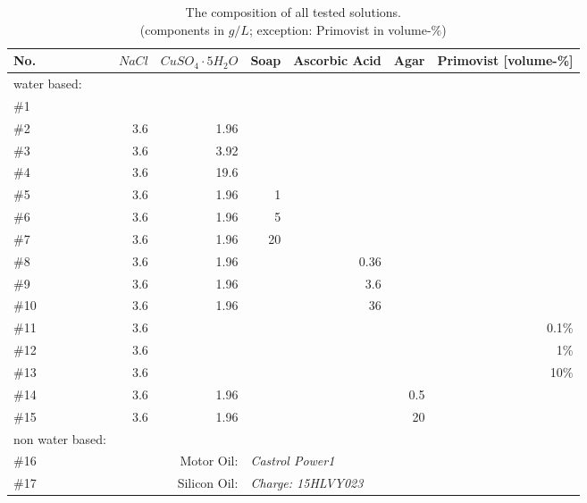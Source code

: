 \begin{table}[!hbt]
\centering
\begin{tabular}{@{}l|rrrrrr@{}}
No.   & $NaCl$   & $CuSO_4\cdot5H_2O$          & Soap & Ascorbic Acid & Agar & Primovist [volume-\%]\\
\toprule
water based: \\
\#1  &             &                   &      &               &           &		\\
\#2  & 3.6         & 1.96              &      &               &           &		\\
\#3  & 3.6         & 3.92              &      &               &           &		\\
\#4  & 3.6         & 19.6              &      &               &           &		\\
\#5  & 3.6         & 1.96              & 1    &               &           &		\\
\#6  & 3.6         & 1.96              & 5    &               &           &		\\
\#7  & 3.6         & 1.96              & 20   &               &           &		\\
\#8  & 3.6         & 1.96              &      & 0.36          &           &		\\
\#9  & 3.6         & 1.96              &      & 3.6           &           &		\\
\#10 & 3.6         & 1.96              &      & 36            &           &		\\
\#11 & 3.6         &                   &      &               &           & 0.1\%	\\
\#12 & 3.6         &                   &      &               &           & 1\%		\\
\#13 & 3.6         &                   &      &               &           & 10\%	\\
\#14 & 3.6         & 1.96              &      &               &  0.5      &		\\
\#15 & 3.6         & 1.96              &      &               &   20      &		\\
\midrule
non water based: \\
\#16 & \multicolumn{2}{r}{Motor Oil:}   & \multicolumn{4}{l}{\textit{Castrol Power1}}      \\
\#17 & \multicolumn{2}{r}{Silicon Oil:} & \multicolumn{4}{l}{\textit{Charge: 15HLVY023}}   \\ \bottomrule
\end{tabular}
\caption{The composition of all tested solutions.\\(components in $g/L$; exception: Primovist in volume-\%)}
\label{tab:solutions}
\end{table}


